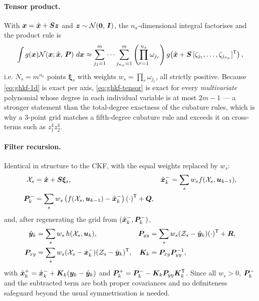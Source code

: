 \paragraph{Tensor product.} With $\bm{x} = \hat{\bm{x}} + \bm{S}\bm{z}$ and $\bm{z}\sim\mathcal{N}\!\left(\bm0,\,\bm{I}\right)$, the
$n_x$-dimensional integral factorises and the product rule is
\begin{equation}
\int g(\bm{x})\mathcal{N}\!\left(\bm{x};\hat{\bm{x}},\,\bm{P}\right)\,d\bm{x} \approx
\sum_{j_1=1}^{m}\cdots\sum_{j_{n_x}=1}^{m}
\left(\prod_{r=1}^{n_x}\omega_{j_r}\right)
g\!\left(\hat{\bm{x}} + \bm{S}\,[\zeta_{j_1},\dots,\zeta_{j_{n_x}}]^{\mathsf{T}}\right),
\label{eq:ghkf-tensor}
\end{equation}
i.e. $N_s = m^{n_x}$ points $\bm{\xi}_s$ with weights $w_s = \prod_r \omega_{j_r}$, all
strictly positive. Because \eqref{eq:ghkf-1d} is exact per axis, \eqref{eq:ghkf-tensor} is
exact for every \emph{multivariate} polynomial whose degree in each individual variable is at
most $2m-1$ --- a stronger statement than the total-degree exactness of the cubature rules,
which is why a $3$-point grid matches a fifth-degree cubature rule and exceeds it on
cross-terms such as $z_1^4z_2^4$.

\paragraph{Filter recursion.} Identical in structure to the CKF, with the equal weights
replaced by $w_s$:
\begin{align}
\mathcal{X}_s &= \hat{\bm{x}} + \bm{S}\bm{\xi}_s, &
\hat{\bm{x}}^{-}_k &= \sum_s w_s f(\mathcal{X}_s,\bm{u}_{k-1}), \label{eq:ghkf-tu1}\\
\bm{P}^{-}_k &= \sum_s w_s\left(f(\mathcal{X}_s,\bm{u}_{k-1})-\hat{\bm{x}}^{-}_k\right)(\cdot)^{\mathsf{T}} + \bm{Q}, &&
\label{eq:ghkf-tu2}
\end{align}
and, after regenerating the grid from $(\hat{\bm{x}}^{-}_k,\bm{P}^{-}_k)$,
\begin{align}
\hat{\bm{y}}_k &= \sum_s w_s\,h(\mathcal{X}_s,\bm{u}_k), &
\bm{P}_{yy} &= \sum_s w_s(\mathcal{Z}_s-\hat{\bm{y}}_k)(\cdot)^{\mathsf{T}} + \bm{R}, \label{eq:ghkf-mu1}\\
\bm{P}_{xy} &= \sum_s w_s(\mathcal{X}_s-\hat{\bm{x}}^{-}_k)(\mathcal{Z}_s-\hat{\bm{y}}_k)^{\mathsf{T}}, &
\bm{K}_k &= \bm{P}_{xy}\bm{P}_{yy}^{-1}, \label{eq:ghkf-mu2}
\end{align}
with $\hat{\bm{x}}^{+}_k = \hat{\bm{x}}^{-}_k + \bm{K}_k(\bm{y}_k-\hat{\bm{y}}_k)$ and
$\bm{P}^{+}_k = \bm{P}^{-}_k - \bm{K}_k\bm{P}_{yy}\bm{K}_k^{\mathsf{T}}$. Since all $w_s>0$, $\bm{P}^{-}_k$ and the
subtracted term are both proper covariances and no definiteness safeguard beyond the usual
symmetrisation is needed.

